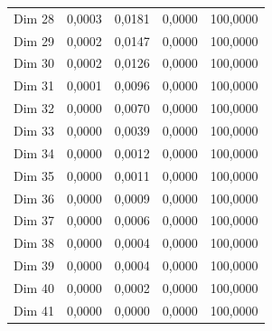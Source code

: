 \begin{table}[H]
\begin{tabular}{|c|c|c|c|c|}
Dim 28 & 0,0003 & 0,0181 & 0,0000 & 100,0000 \\
Dim 29 & 0,0002 & 0,0147 & 0,0000 & 100,0000 \\
Dim 30 & 0,0002 & 0,0126 & 0,0000 & 100,0000 \\
Dim 31 & 0,0001 & 0,0096 & 0,0000 & 100,0000 \\
Dim 32 & 0,0000 & 0,0070 & 0,0000 & 100,0000 \\
Dim 33 & 0,0000 & 0,0039 & 0,0000 & 100,0000 \\
Dim 34 & 0,0000 & 0,0012 & 0,0000 & 100,0000 \\
Dim 35 & 0,0000 & 0,0011 & 0,0000 & 100,0000 \\
Dim 36 & 0,0000 & 0,0009 & 0,0000 & 100,0000 \\
Dim 37 & 0,0000 & 0,0006 & 0,0000 & 100,0000 \\
Dim 38 & 0,0000 & 0,0004 & 0,0000 & 100,0000 \\
Dim 39 & 0,0000 & 0,0004 & 0,0000 & 100,0000 \\
Dim 40 & 0,0000 & 0,0002 & 0,0000 & 100,0000 \\
Dim 41 & 0,0000 & 0,0000 & 0,0000 & 100,0000 \\
\hline
\end{tabular}
\end{table}